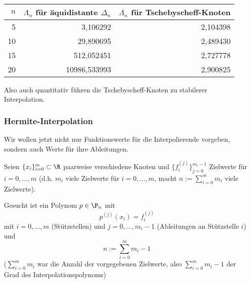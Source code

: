 \documentclass[a4paper,11pt]{scrartcl}
\begin{document}
\begin{ex*}~

	\begin{table}[h]
		\centering
		\begin{tabular}{r|r|r}
			$n$ & $\Lambda_n$ für äquidistante $\Delta_n$ & $\Lambda_n$ für Tschebyscheff-Knoten \\ \hline
			5 & 3,106292 & 2,104398 \\
			10 & 29,890695 & 2,489430 \\
			15 & 512,052451 & 2,727778 \\
			20 & 10986,533993 & 2,900825
		\end{tabular}
	\end{table}		
	Also auch quantitativ führen die Tschebyscheff-Knoten zu stabilerer Interpolation.
\end{ex*}


\subsubsection{Hermite-Interpolation}

Wir wollen jetzt nicht nur Funktionswerte für die Interpolierende vorgeben, sondern auch Werte für ihre Ableitungen.

Seien $\{x_i\}_{i=0}^m \subset \R$ paarweise verschiedene Knoten und $\{f_i^{(j)}\}_{j=0}^{m_i-1}$ Zielwerte für $i=0,\dotsc, m$ (d.h. $m_i$ viele Zielwerte für $i=0,\dotsc, m$, macht $n := \sum_{i=0}^m m_i$ viele Zielwerte).

Gesucht ist ein Polynom $p\in \P_n$ mit 
\[
	p^{(j)}(x_i) =f_i^{(j)}
\]
mit $i=0,\dotsc,m$ (Stützstellen) und $j=0,\dotsc,m_i-1$ (Ableitungen an Stützstelle $i$) und 
\[
	n := \sum_{i=0}^m m_i - 1
\]
($\sum_{i=0}^m m_i$ war die Anzahl der vorgegebenen Zielwerte, also $\sum_{i=0}^m m_i -1$ der Grad des Interpolationspolynoms)
\end{document}
